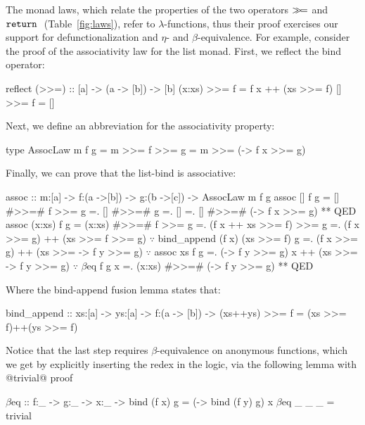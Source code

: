 

%
The monad laws, which relate the
properties of the two operators
$\gg\!=$ and $\texttt{return}\ $ (Table~\ref{fig:laws}),
refer to $\lambda$-functions,
thus their proof exercises
our support for defunctionalization
and $\eta$- and $\beta$-equivalence.
%
For example, consider the proof of the
associativity law for the list monad.
First, we reflect the bind operator:
%
\begin{code}
  reflect (>>=) :: [a] -> (a -> [b]) -> [b]
  (x:xs) >>= f = f x ++ (xs >>= f)
  []     >>= f = []
\end{code}
%
Next, we define an abbreviation for the associativity property:
%
\begin{code}
type AssocLaw m f g =
  {m >>= f >>= g = m >>= (\x -> f x >>= g)}
\end{code}
%
Finally, we can prove that the list-bind is associative:
%
\begin{mcode}
assoc :: m:[a] -> f:(a ->[b]) -> g:(b ->[c])
      -> AssocLaw m f g
assoc [] f g
  =  [] #>>=# f >>= g
  =. [] #>>=# g
  =. []
  =. [] #>>=# (\x -> f x >>= g) ** QED
assoc (x:xs) f g
  =  (x:xs) #>>=# f  >>= g
  =. (f x ++ xs >>= f) >>= g
  =. (f x >>= g) ++ (xs >>= f >>= g)
     $\because$ bind_append (f x) (xs >>= f) g
  =. (f x >>= g) ++ (xs >>= \y -> f y >>= g)
     $\because$ assoc xs f g
  =. (\y -> f y >>= g) x ++
     (xs >>= \y -> f y >>= g)
     $\because$ $\beta$eq f g x
  =. (x:xs) #>>=# (\y -> f y >>= g) ** QED
\end{mcode}
%
Where the bind-append fusion lemma states that:
%
\begin{code}
bind_append ::
  xs:[a] -> ys:[a] -> f:(a -> [b]) ->
  {(xs++ys) >>= f = (xs >>= f)++(ys >>= f)}
\end{code}
%
Notice that the last step requires
$\beta$-equivalence on anonymous
functions, which we get by explicitly
inserting the redex in the logic,
via the following lemma with @trivial@ proof
%
\begin{mcode}
  $\beta$eq :: f:_ -> g:_ -> x:_ ->
     {bind (f x) g = (\y -> bind (f y) g) x}
  $\beta$eq _ _ _ = trivial
\end{mcode}
%

